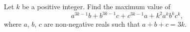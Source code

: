 Let $k$ be a positive integer. Find the maximum value of \[a^{3k-1}b+b^{3k-1}c+c^{3k-1}a+k^2a^kb^kc^k,\] where $a$, $b$, $c$ are non-negative reals such that $a+b+c=3k$.